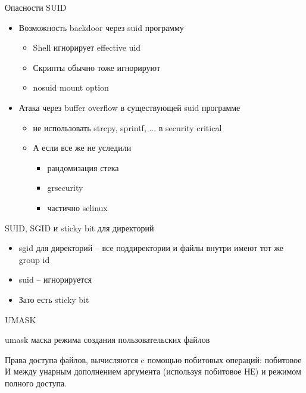 \begin{frame}{Опасности SUID}
	\begin{itemize}
		\item Возможность backdoor через suid программу
			\begin{itemize}
				\item Shell игнорирует effective uid
				\item Скрипты обычно тоже игнорируют
				\item nosuid mount option
			\end{itemize}
		\item Атака через buffer overflow в существующей suid программе
			\begin{itemize}
				\item не использовать strcpy, sprintf, ... в security critical
				\item А если все же не уследили
					\begin{itemize}
						\item рандомизация стека
						\item grsecurity
						\item частично selinux
					\end{itemize}
			\end{itemize}
	\end{itemize}
\end{frame}


\begin{frame}{SUID, SGID и sticky bit для директорий}
	\begin{itemize}
		\item sgid для директорий -- все поддиректории и файлы внутри имеют тот же group id
		\item suid -- игнорируется
		\item Зато есть sticky bit 
	\end{itemize}
\end{frame}

\begin{frame}{UMASK}

	\begin{block}{umask}
		маска режима создания пользовательских файлов
	\end{block}

	Права доступа файлов, вычисляются c помощью побитовых операций:
	побитовое И между унарным дополнением аргумента (используя побитовое НЕ) и режимом полного доступа.

\end{frame}

